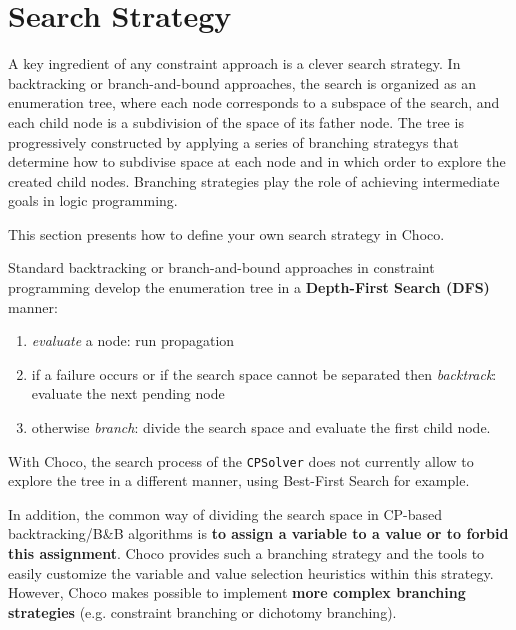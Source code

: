 \section{Search Strategy}\label{solver:searchstrategy}\hypertarget{solver:searchstrategy}{}


A key ingredient of any constraint approach is a clever \gls{search strategy}. 
In backtracking or branch-and-bound approaches, the search is organized as an enumeration tree, where each node corresponds to a subspace of the search, and each child node is a subdivision of the space of its father node.
The tree is progressively constructed by applying a series of \glspl{branching strategy} that determine how to subdivise space at each node and in which order to explore the created child nodes. Branching strategies play the role of achieving intermediate goals in logic programming. 

This section presents how to define your own search strategy in Choco. 
\begin{note}
  Standard backtracking or branch-and-bound approaches in constraint programming develop the enumeration tree in a \textbf{Depth-First Search (DFS)} manner:
  \begin{enumerate}
  \item \emph{evaluate} a node: run propagation 
  \item if a failure occurs or if the search space cannot be separated then \emph{backtrack}: evaluate the next pending node
  \item otherwise \emph{branch}: divide the search space and evaluate the first child node.
  \end{enumerate}
  With Choco, the search process of the \texttt{CPSolver} does not currently allow to explore the tree in a different manner, using Best-First Search for example. 

  In addition, the common way of dividing the search space in CP-based backtracking/B\&B algorithms is \textbf{to assign a variable to a value or to forbid this assignment}. Choco provides such a branching strategy and the tools to easily customize the variable and value selection heuristics within this strategy. However, Choco makes possible to implement \textbf{more complex branching strategies} (e.g. constraint branching or dichotomy branching).
\end{note}


